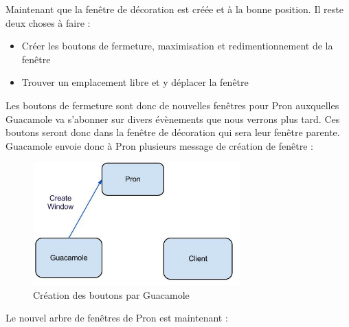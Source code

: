 \begin{center}
\end{center}

Maintenant que la fenêtre de décoration est créée et à la bonne position.
Il reste deux choses à faire :

\begin{itemize}
  \item Créer les boutons de fermeture, maximisation et redimentionnement de la fenêtre
  \item Trouver un emplacement libre et y déplacer la fenêtre
\end{itemize}

Les boutons de fermeture sont donc de nouvelles fenêtres pour Pron auxquelles Guacamole va s'abonner sur divers évènements que nous verrons plus tard.
Ces boutons seront donc dans la fenêtre de décoration qui sera leur fenêtre parente.
Guacamole envoie donc à Pron plusieurs message de création de fenêtre :

\begin{figure}[H]
  \centering
  \includegraphics[width=8cm]{images/Guacamole_anim_6.jpg}
  \caption{Création des boutons par Guacamole}
  \label{fig:guacamole_anim_6}
\end{figure}

Le nouvel arbre de fenêtres de Pron est maintenant :

\begin{center}
\end{center}

